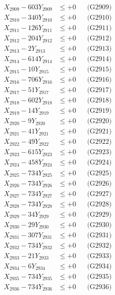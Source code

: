 \documentclass[a4paper,10pt]{article}
\begin{document}
{\begin{align}
X_{2909} - 603Y_{2909} &\leq +0 && \text{(G2909)} \\
X_{2910} - 340Y_{2910} &\leq +0 && \text{(G2910)} \\
\allowbreak
X_{2911} - 126Y_{2911} &\leq +0 && \text{(G2911)} \\
X_{2912} - 204Y_{2912} &\leq +0 && \text{(G2912)} \\
X_{2913} - 2Y_{2913} &\leq +0 && \text{(G2913)} \\
X_{2914} - 614Y_{2914} &\leq +0 && \text{(G2914)} \\
X_{2915} - 10Y_{2915} &\leq +0 && \text{(G2915)} \\
X_{2916} - 706Y_{2916} &\leq +0 && \text{(G2916)} \\
X_{2917} - 51Y_{2917} &\leq +0 && \text{(G2917)} \\
X_{2918} - 602Y_{2918} &\leq +0 && \text{(G2918)} \\
X_{2919} - 14Y_{2919} &\leq +0 && \text{(G2919)} \\
X_{2920} - 9Y_{2920} &\leq +0 && \text{(G2920)} \\
\allowbreak
X_{2921} - 41Y_{2921} &\leq +0 && \text{(G2921)} \\
X_{2922} - 49Y_{2922} &\leq +0 && \text{(G2922)} \\
X_{2923} - 615Y_{2923} &\leq +0 && \text{(G2923)} \\
X_{2924} - 458Y_{2924} &\leq +0 && \text{(G2924)} \\
X_{2925} - 734Y_{2925} &\leq +0 && \text{(G2925)} \\
X_{2926} - 734Y_{2926} &\leq +0 && \text{(G2926)} \\
X_{2927} - 734Y_{2927} &\leq +0 && \text{(G2927)} \\
X_{2928} - 734Y_{2928} &\leq +0 && \text{(G2928)} \\
X_{2929} - 34Y_{2929} &\leq +0 && \text{(G2929)} \\
X_{2930} - 29Y_{2930} &\leq +0 && \text{(G2930)} \\
\allowbreak
X_{2931} - 307Y_{2931} &\leq +0 && \text{(G2931)} \\
X_{2932} - 734Y_{2932} &\leq +0 && \text{(G2932)} \\
X_{2933} - 21Y_{2933} &\leq +0 && \text{(G2933)} \\
X_{2934} - 6Y_{2934} &\leq +0 && \text{(G2934)} \\
X_{2935} - 734Y_{2935} &\leq +0 && \text{(G2935)} \\
X_{2936} - 734Y_{2936} &\leq +0 && \text{(G2936)} \\

\end{align}}
\end{document}
